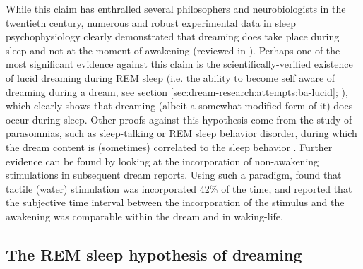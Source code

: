 While this claim has enthralled several philosophers and neurobiologists in the twentieth century, numerous and robust experimental data in sleep psychophysiology clearly demonstrated that dreaming does take place during sleep and not at the moment of awakening (reviewed in \citealp{guenole_reve_2010}). Perhaps one of the most significant evidence against this claim is the scientifically-verified existence of lucid dreaming during REM sleep (i.e. the ability to become self aware of dreaming during a dream, see section \ref{sec:dream-research:attempts:ba-lucid}; \citealp{laberge_exploring_1991, dresler_neural_2012}), which clearly shows that dreaming (albeit a somewhat modified form of it) does occur during sleep. Other proofs against this hypothesis come from the study of parasomnias, such as sleep-talking or REM sleep behavior disorder, during which the dream content is (sometimes) correlated to the sleep behavior \citep{ellman_mind_1991, schenck_rem_2002, leclair-visonneau_eyes_2010, valli_can_2012}. Further evidence can be found by looking at the incorporation of non-awakening stimulations in subsequent dream reports. Using such a paradigm, \citet{dement_relation_1958} found that tactile (water) stimulation was incorporated 42\% of the time, and reported that the subjective time interval between the incorporation of the stimulus and the awakening was comparable within the dream and in waking-life.

\subsection{The REM sleep hypothesis of dreaming}
\label{sec:dream-research:link:rem-sleep}

